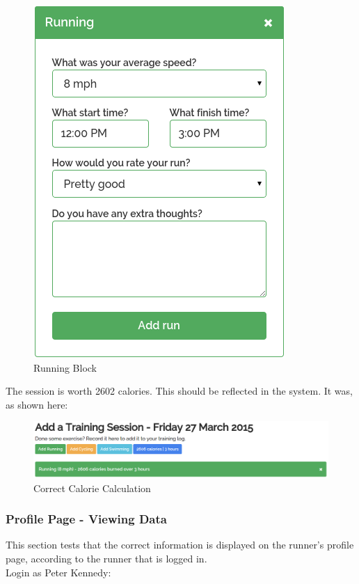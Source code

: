 \documentclass{article}[12pt,a4paper]
\begin{document}
{\begin{figure}[h!]
    \includegraphics[scale=0.33]{images/testing/calorie/running}
    \caption{Running Block}
\end{figure}

The session is worth 2602 calories. This should be reflected in the system. It was, as shown here:

\begin{figure}[h!]
    \includegraphics[scale=0.33]{images/testing/calorie/finished}
    \caption{Correct Calorie Calculation}
\end{figure}

\subsubsection{Profile Page - Viewing Data}
This section tests that the correct information is displayed on the runner's profile page, according to the runner that is logged in.\\

Login as Peter Kennedy:

}
\end{document}
